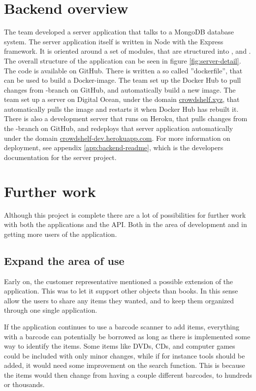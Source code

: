 \section{Backend overview}
\label{backend-conclusion}
The team developed a server application that talks to a MongoDB database system. The server application itself is written in Node with the Express framework. It is oriented around a set of modules, that are structured into ,  and . The overall structure of the application can be seen in figure \ref{fig:server-detail}. The code is available on GitHub. There is written a so called ''dockerfile'', that can be used to build a Docker-image. The team set up the Docker Hub to pull changes from -\gls{branch} on GitHub, and automatically build a new image. The team set up a server on Digital Ocean, under the domain \url{crowdshelf.xyz}, that automatically pulls the image and restarts it when Docker Hub has rebuilt it.  \cite{docker}\cite{dockerhub-crowdshelf} There is also a development server that runs on Heroku, that pulls changes from the -\gls{branch} on GitHub, and redeploys that server application automatically under the domain \url{crowdshelf-dev.herokuapp.com}. For more information on deployment, see appendix \ref{app:backend-readme}, which is the developers documentation for the server project.

\section{Further work}
Although this project is complete there are a lot of possibilities for further work with both the applications and the \gls{API}. Both in the area of development and in getting more users of the application.


\subsection{Expand the area of use}
Early on, the customer representative mentioned a possible extension of the application. This was to let it support other objects than books. In this sense allow the users to share any items they wanted, and to keep them organized through one single application. 

If the application continues to use a barcode scanner to add items, everything with a barcode can potentially be borrowed as long as there is implemented some way to identify the items. Some items like DVDs, CDs, and computer games could be included with only minor changes, while if for instance tools should be added, it would need some improvement on the search function. This is because the items would then change from having a couple different barcodes, to hundreds or thousands.

